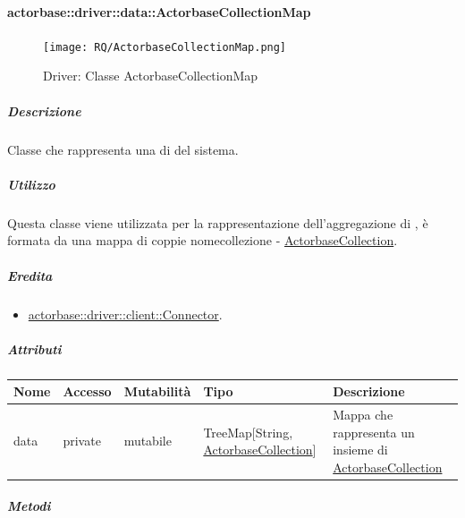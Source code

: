 \documentclass{scalatekids-article}
\begin{document}

\paragraph{actorbase::driver::data::ActorbaseCollectionMap}
\label{sec:actorbase::driver::data::ActorbaseCollectionMap}

\begin{figure}[H]
  \begin{center}
    \texttt{[image: RQ/ActorbaseCollectionMap.png]}
    \caption{Driver: Classe ActorbaseCollectionMap}
  \end{center}
\end{figure}

\subparagraph{Descrizione}

Classe che rappresenta una  di  del sistema.

\subparagraph{Utilizzo}

Questa classe viene utilizzata per la rappresentazione dell'aggregazione di
, è formata da una mappa di coppie nomecollezione -
\hyperref[sec:actorbase::driver::data::ActorbaseCollection]{ActorbaseCollection}.

\subparagraph{Eredita}

\begin{itemize}
\item \hyperref[sec:actorbase::driver::client::Connector]{actorbase::driver::client::Connector}.
\end{itemize}

\subparagraph{Attributi}

\begin{tabular}{| p{2.5cm} | p{1.5cm} | p{2cm} | p{2.5cm} | p{8.5cm} |}
  \hline
  Nome & Accesso & Mutabilità & Tipo & Descrizione\\
  \hline
  data & private & mutabile & TreeMap[String, \hyperref[sec:actorbase::driver::data::ActorbaseCollection]{ActorbaseCollection}] & Mappa che rappresenta un insieme di \hyperref[sec:actorbase::driver::data::ActorbaseCollection]{ActorbaseCollection}\\
  \hline
\end{tabular}

\subparagraph{Metodi}

\end{document}
